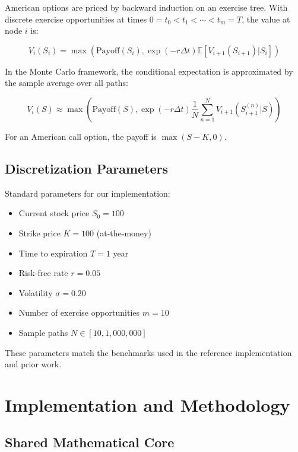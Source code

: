 \documentclass[11pt,a4paper]{article}
\begin{document}
American options are priced by backward induction on an exercise tree. With discrete exercise opportunities at times $0 = t_0 < t_1 < \cdots < t_m = T$, the value at node $i$ is:

\begin{equation}
V_i(S_i) = \max\left(\text{Payoff}(S_i), \exp(-r \Delta t) \mathbb{E}[V_{i+1}(S_{i+1}) | S_i]\right)
\end{equation}

In the Monte Carlo framework, the conditional expectation is approximated by the sample average over all paths:

\begin{equation}
V_i(S) \approx \max\left(\text{Payoff}(S), \exp(-r \Delta t) \frac{1}{N} \sum_{n=1}^{N} V_{i+1}(S_{i+1}^{(n)} | S)\right)
\end{equation}

For an American call option, the payoff is $\max(S - K, 0)$.

\subsection{Discretization Parameters}

Standard parameters for our implementation:

\begin{itemize}
    \item Current stock price $S_0 = 100$
    \item Strike price $K = 100$ (at-the-money)
    \item Time to expiration $T = 1$ year
    \item Risk-free rate $r = 0.05$
    \item Volatility $\sigma = 0.20$
    \item Number of exercise opportunities $m = 10$
    \item Sample paths $N \in [10, 1{,}000{,}000]$
\end{itemize}

These parameters match the benchmarks used in the reference implementation and prior work.

\section{Implementation and Methodology}\label{sec:implementation}

\subsection{Shared Mathematical Core}
\end{document}
